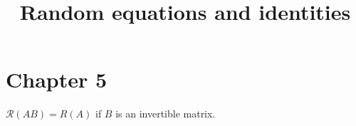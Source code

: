 \documentclass{article}
\begin{document}
\title{\bf Random equations and identities}
\maketitle
\section*{Chapter 5}

$\mathcal{R}(AB) = R(A)$ if $B$ is an invertible matrix.

\end{document}
